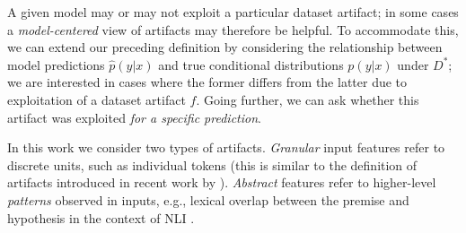 \documentclass[11pt]{article}
\begin{document}
A given model may or may not exploit a particular dataset artifact; in some cases a \emph{model-centered} view of artifacts may therefore be helpful.
To accommodate this, we can extend our preceding definition by considering the relationship between model predictions $\hat{p}(y|x)$ and true conditional distributions $p(y|x)$ under $D^*$; we are interested in cases where the former differs from the latter due to exploitation of a dataset artifact $f$.
Going further, we can ask whether this artifact was exploited \emph{for a specific prediction}.



In this work we consider two types of artifacts. %
\emph{Granular} input features refer to discrete units, such as individual tokens (this is similar to the definition of artifacts introduced in recent work by \citealt{gardner2021competency}). \emph{Abstract} features refer to higher-level \emph{patterns} observed in inputs, e.g., lexical overlap between the premise and hypothesis in the context of NLI \cite{mccoy2019right}.
\end{document}
